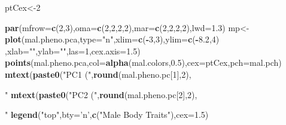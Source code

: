\documentclass[11pt,]{article}
\newenvironment{Shaded}{\begin{snugshade}}{\end{snugshade}}
\newcommand{\KeywordTok}[1]{\textcolor[rgb]{0.13,0.29,0.53}{\textbf{#1}}}
\newcommand{\DataTypeTok}[1]{\textcolor[rgb]{0.13,0.29,0.53}{#1}}
\newcommand{\DecValTok}[1]{\textcolor[rgb]{0.00,0.00,0.81}{#1}}
\newcommand{\FloatTok}[1]{\textcolor[rgb]{0.00,0.00,0.81}{#1}}
\newcommand{\StringTok}[1]{\textcolor[rgb]{0.31,0.60,0.02}{#1}}
\newcommand{\OperatorTok}[1]{\textcolor[rgb]{0.81,0.36,0.00}{\textbf{#1}}}
\newcommand{\NormalTok}[1]{#1}
\begin{document}
\begin{Shaded}
\begin{Highlighting}[]
\NormalTok{ptCex<-}\DecValTok{2}

\KeywordTok{par}\NormalTok{(}\DataTypeTok{mfrow=}\KeywordTok{c}\NormalTok{(}\DecValTok{2}\NormalTok{,}\DecValTok{3}\NormalTok{),}\DataTypeTok{oma=}\KeywordTok{c}\NormalTok{(}\DecValTok{2}\NormalTok{,}\DecValTok{2}\NormalTok{,}\DecValTok{2}\NormalTok{,}\DecValTok{2}\NormalTok{),}\DataTypeTok{mar=}\KeywordTok{c}\NormalTok{(}\DecValTok{2}\NormalTok{,}\DecValTok{2}\NormalTok{,}\DecValTok{2}\NormalTok{,}\DecValTok{2}\NormalTok{),}\DataTypeTok{lwd=}\FloatTok{1.3}\NormalTok{)}
\NormalTok{mp<-}\KeywordTok{plot}\NormalTok{(mal.pheno.pca,}\DataTypeTok{type=}\StringTok{"n"}\NormalTok{,}\DataTypeTok{xlim=}\KeywordTok{c}\NormalTok{(}\OperatorTok{-}\DecValTok{3}\NormalTok{,}\DecValTok{3}\NormalTok{),}\DataTypeTok{ylim=}\KeywordTok{c}\NormalTok{(}\OperatorTok{-}\FloatTok{8.2}\NormalTok{,}\DecValTok{4}\NormalTok{)}
\NormalTok{    ,}\DataTypeTok{xlab=}\StringTok{""}\NormalTok{,}\DataTypeTok{ylab=}\StringTok{""}\NormalTok{,}\DataTypeTok{las=}\DecValTok{1}\NormalTok{,}\DataTypeTok{cex.axis=}\FloatTok{1.5}\NormalTok{)}
\KeywordTok{points}\NormalTok{(mal.pheno.pca,}\DataTypeTok{col=}\KeywordTok{alpha}\NormalTok{(mal.colors,}\FloatTok{0.5}\NormalTok{),}\DataTypeTok{cex=}\NormalTok{ptCex,}\DataTypeTok{pch=}\NormalTok{mal.pch)}
\KeywordTok{mtext}\NormalTok{(}\KeywordTok{paste0}\NormalTok{(}\StringTok{"PC1 ("}\NormalTok{,}\KeywordTok{round}\NormalTok{(mal.pheno.pc[}\DecValTok{1}\NormalTok{],}\DecValTok{2}\NormalTok{),}\StringTok{"%)"}\NormalTok{),}\DecValTok{1}\NormalTok{,}\DataTypeTok{line=}\DecValTok{2}\NormalTok{)}
\KeywordTok{mtext}\NormalTok{(}\KeywordTok{paste0}\NormalTok{(}\StringTok{"PC2 ("}\NormalTok{,}\KeywordTok{round}\NormalTok{(mal.pheno.pc[}\DecValTok{2}\NormalTok{],}\DecValTok{2}\NormalTok{),}\StringTok{"%)"}\NormalTok{),}\DecValTok{2}\NormalTok{,}\DataTypeTok{line=}\FloatTok{2.5}\NormalTok{)}
\KeywordTok{legend}\NormalTok{(}\StringTok{"top"}\NormalTok{,}\DataTypeTok{bty=}\StringTok{'n'}\NormalTok{,}\KeywordTok{c}\NormalTok{(}\StringTok{"Male Body Traits"}\NormalTok{),}\DataTypeTok{cex=}\FloatTok{1.5}\NormalTok{)}

}}
\end{Highlighting}
\end{Shaded}
\end{document}
